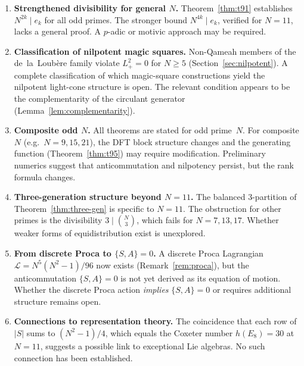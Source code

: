 \documentclass[aip,jmp,reprint,superscriptaddress,floatfix,nofootinbib]{revtex4-2}
\theoremstyle{definition}
\theoremstyle{remark}
\begin{document}
\begin{enumerate}
\item \textbf{Strengthened divisibility for general $N$.}
      Theorem~\ref{thm:t91} establishes $N^{2k} \mid e_k$ for all odd
      primes.  The stronger bound $N^{4k} \mid e_k$, verified for $N=11$,
      lacks a general proof.  A $p$-adic or motivic approach may be
      required.

\item \textbf{Classification of nilpotent magic squares.}
      Non-Qameah members of the de~la~Loub\`ere family violate $L_+^2 = 0$ for $N\ge 5$
      (Section~\ref{sec:nilpotent}).  A complete classification of which
      magic-square constructions yield the nilpotent light-cone structure
      is open.  The relevant condition appears to be the complementarity
      of the circulant generator (Lemma~\ref{lem:complementarity}).

\item \textbf{Composite odd $N$.}
      All theorems are stated for odd prime~$N$.  For composite $N$
      (e.g.\ $N = 9, 15, 21$), the DFT block structure changes and the
      generating function (Theorem~\ref{thm:t95}) may require
      modification.  Preliminary numerics suggest that anticommutation
      and nilpotency persist, but the rank formula changes.

\item \textbf{Three-generation structure beyond $N=11$.}
      The balanced 3-partition of Theorem~\ref{thm:three-gen} is specific
      to $N=11$.  The obstruction for other primes is the divisibility
      $3 \mid \binom{N}{3}$, which fails for $N = 7, 13, 17$.
      Whether weaker forms of equidistribution exist is unexplored.

\item \textbf{From discrete Proca to $\{S,A\}=0$.}
      A discrete Proca Lagrangian $\mathcal{L}=N^5(N^2{-}1)/96$ now exists
      (Remark~\ref{rem:proca}), but the anticommutation $\{S,A\}=0$
      is not yet derived as its equation of motion.  Whether the discrete Proca
      action \emph{implies} $\{S,A\}=0$ or requires additional structure
      remains open.

\item \textbf{Connections to representation theory.}
      The coincidence that each row of $|S|$ sums to $(N^2{-}1)/4$, which
      equals the Coxeter number $h(E_8) = 30$ at $N{=}11$, suggests a
      possible link to exceptional Lie algebras.  No such connection has
      been established.
\end{enumerate}
\end{document}
